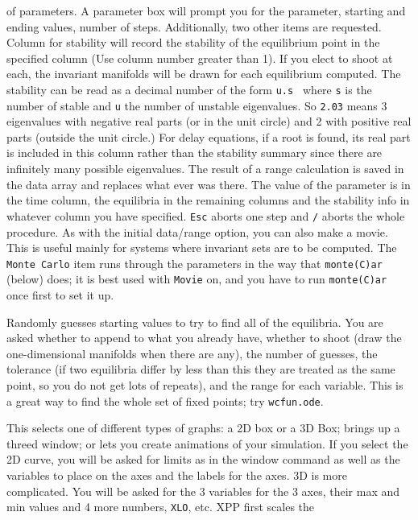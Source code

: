 \documentclass{article}
\newcommand{\tc}[1]{\addcontentsline{toc}{subsection}{#1}}
\begin{document}
\begin{description}
\begin{description}
 of parameters.  A parameter box will prompt you for the parameter, starting
 and ending values, number of steps.  Additionally, two other items are 
requested.  Column for stability will record the stability of the equilibrium 
point in the specified column (Use column number greater than 1).  
If you elect to shoot at each, the invariant 
manifolds will be drawn for each equilibrium computed.  The stability can be 
read as a decimal number of the form {\tt  u.s } where {\tt s}  is the
number of stable and {\tt u} 
 the number of unstable eigenvalues. So {\tt 2.03} means 3 eigenvalues
with negative real parts (or in the unit circle) and 2 with positive
real parts (outside the unit circle.)  
For delay equations, if a root is found, its real part is included in
this column rather than the stability summary since there are
infinitely many possible eigenvalues.
The result of a range calculation is saved 
in the data array and replaces what ever was there.  The value of the parameter
 is in the time column, the equilibria in the remaining columns and the 
stability info in whatever column you have specified. 
 {\tt Esc} aborts one step and 
{\tt /}  aborts the whole procedure. As with the initial data/range
option, you can also make a movie.  This is useful mainly for systems
where invariant sets are to be computed.  The {\tt Monte Carlo} item runs through the parameters in the
way that {\tt monte(C)ar} (below) does; it is best used with {\tt Movie} on, and you have to run
{\tt monte(C)ar} once first to set it up.
\item[monte(C)ar]  Randomly guesses starting values to try to find all of the equilibria.  You are asked
whether to append to what you already have, whether to shoot (draw the one-dimensional manifolds when
there are any), the number of guesses, the tolerance (if two equilibria differ by less than this they are
treated as the same point, so you do not get lots of repeats), and the range for each variable.  This is a great way to find
the whole set of fixed points; try {\tt wcfun.ode}.
\end{description} 
\tc{Axes}\item[(V)iew axes]  This selects one of  different types of graphs: 
a 2D box or a 3D Box; brings up a threed window; or lets you create
animations of your simulation. 
If you select the 2D curve, you will be asked for limits 
as in the window command as well as the variables to place on the axes
and the labels for the axes.   
3D is more complicated.  You will be asked for the 3 variables for the 3 axes, 
their max and min values and 4 more numbers, {\tt XLO},  etc.  XPP first scales the 

\end{description}
\end{document}
